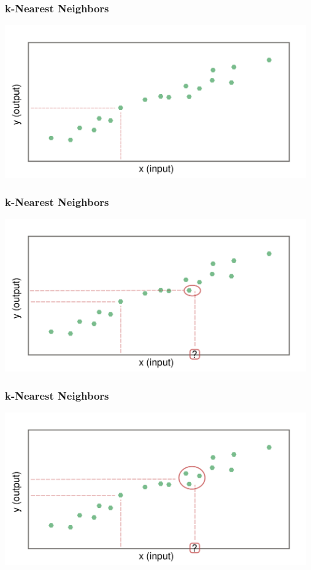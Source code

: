 \documentclass[aspectratio=169]{beamer}
\begin{document}
\begin{frame}
  \frametitle{k-Nearest Neighbors}
  \begin{center}
    \includegraphics[width=13.0cm]{images/k_nearest_neighbour_regression_only_training_data.pdf}
  \end{center}
\end{frame}

\begin{frame}
  \frametitle{k-Nearest Neighbors}
  \begin{center}
    \includegraphics[width=13.0cm]{images/k_nearest_neighbour_regression_k_1.pdf}    
  \end{center}
\end{frame}

\begin{frame}
  \frametitle{k-Nearest Neighbors}
  \begin{center}
    \includegraphics[width=13.0cm]{images/k_nearest_neighbour_regression_k_3.pdf}
  \end{center}
\end{frame}
\end{document}
